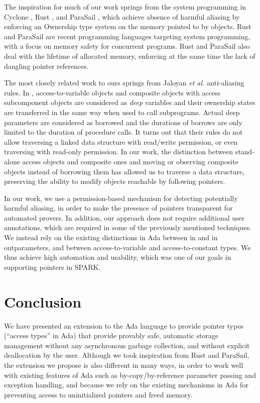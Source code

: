 \documentclass{llncs}
\newcommand{\keyword}[1]{\textsf{#1}}
\begin{document}
The inspiration for much of our work springs from the system programming in Cyclone \cite{Grossman2002}, Rust \cite{Balasubramanian17}, and ParaSail \cite{Taft11}, which achieve absence of
harmful aliasing by enforcing an Ownership type system on the memory pointed to by objects. Rust and ParaSail are recent programming languages targeting system
programming, with a focus on memory safety for concurrent programs.
Rust and ParaSail also deal with the lifetime of allocated memory, enforcing
at the same time the lack of dangling pointer references.

The most closely related work to ours springs from Jaloyan \textit{et al.} \cite{Jaloyan18} anti-aliasing rules. In \cite{Jaloyan18}, access-to-variable objects
and composite objects with access subcomponent objects are considered as \textit{deep} variables and their ownership states are transferred in the same way when used to call subprograms.
Actual deep parameters are considered as borrowed and the durations of borrows are only limited to the duration of procedure calls.   
It turns out that their rules do not allow traversing a linked data structure with read/write permission, or even traversing with read-only permission. In our work, the distinction between stand-alone access
objects and composite ones and moving or observing composite objects instead of borrowing them has allowed us to traverse a data structure, preserving the ability to modify objects reachable by following pointers. 

In our work, we use a permission-based mechanism for detecting potentially harmful aliasing, in order to make the presence of pointers transparent for automated provers.
In addition, our approach does not require additional user annotations, which are required in some of the previously mentioned techniques.  We instead rely on the existing distinctions in Ada between \keyword{in} and \keyword{in out}parameters, and between access-to-variable and access-to-constant types. We thus achieve high automation
and usability, which was one of our goals in supporting pointers in SPARK.


\section{Conclusion}
We have presented an extension to the Ada language to provide pointer types (``access types'' in Ada) that provide provably safe, automatic
storage management without any asynchronous garbage collection, and without explicit deallocation by the user. Although we took inspiration
from Rust and ParaSail, the extension we propose is also different in many ways, in order to work well with existing features of Ada such
as by-copy/by-reference parameter passing and exception handling, and because we rely on the existing mechanisms in Ada for preventing access
to uninitialized pointers and freed memory. 
\end{document}
